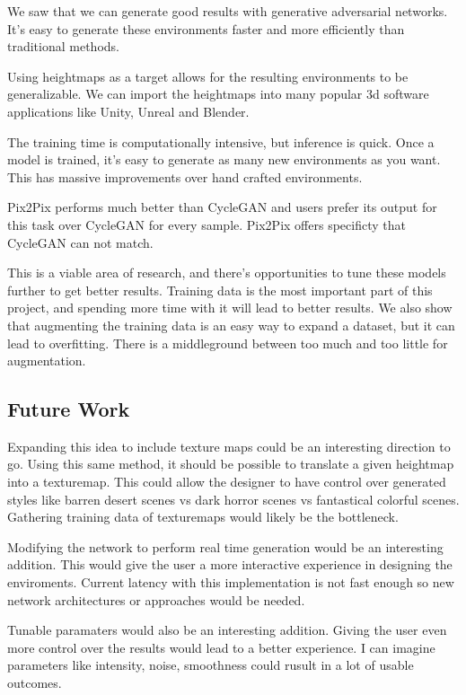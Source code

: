 \documentclass[twocolumn]{article}
\begin{document}
	We saw that we can generate good results with generative adversarial networks. It's easy to generate these environments faster and more efficiently than traditional methods.
	
	Using heightmaps as a target allows for the resulting environments to be generalizable. We can import the heightmaps into many popular 3d software applications like Unity, Unreal and Blender.
	
	The training time is computationally intensive, but inference is quick. Once a model is trained, it's easy to generate as many new environments as you want. This has massive improvements over hand crafted environments.
	
	Pix2Pix performs much better than CycleGAN and users prefer its output for this task over CycleGAN for every sample. Pix2Pix offers specificty that CycleGAN can not match.
	
	This is a viable area of research, and there's opportunities to tune these models further to get better results. Training data is the most important part of this project, and spending more time with it will lead to better results. We also show that augmenting the training data is an easy way to expand a dataset, but it can lead to overfitting. There is a middleground between too much and too little for augmentation.
	
	\subsection{Future Work}
	
	Expanding this idea to include texture maps could be an interesting direction to go. Using this same method, it should be possible to translate a given heightmap into a texturemap. This could allow the designer to have control over generated styles like barren desert scenes vs dark horror scenes vs fantastical colorful scenes. Gathering training data of texturemaps would likely be the bottleneck.
	
	Modifying the network to perform real time generation would be an interesting addition. This would give the user a more interactive experience in designing the enviroments. Current latency with this implementation is not fast enough so new network architectures or approaches would be needed.
	
	Tunable paramaters would also be an interesting addition. Giving the user even more control over the results would lead to a better experience. I can imagine parameters like intensity, noise, smoothness could rusult in a lot of usable outcomes.
	
\end{document}
